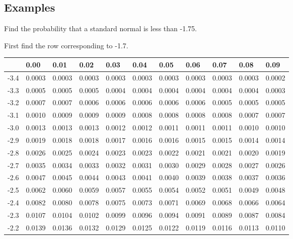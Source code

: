 \subsection{Examples}

\begin{frame}{\small Find the probability that a standard normal is less than -1.75.}
  
{\small First find the row corresponding to -1.7.}

  {
\fontsize{5pt}{5pt}
\selectfont

\begin{tabular}{l|llllllllll}
     & 0.00   & 0.01   & 0.02   & 0.03   &  0.04   & 0.05   & 0.06   & 0.07   & 0.08  & 0.09 \\ \hline
-3.4 & 0.0003 & 0.0003 & 0.0003 & 0.0003 & 0.0003 & 0.0003 & 0.0003 & 0.0003 & 0.0003 & 0.0002 \\ 
-3.3 & 0.0005 & 0.0005 & 0.0005 & 0.0004 & 0.0004 & 0.0004 & 0.0004 & 0.0004 & 0.0004 & 0.0003 \\ 
-3.2 & 0.0007 & 0.0007 & 0.0006 & 0.0006 & 0.0006 & 0.0006 & 0.0006 & 0.0005 & 0.0005 & 0.0005 \\ 
-3.1 & 0.0010 & 0.0009 & 0.0009 & 0.0009 & 0.0008 & 0.0008 & 0.0008 & 0.0008 & 0.0007 & 0.0007 \\ 
-3.0 & 0.0013 & 0.0013 & 0.0013 & 0.0012 & 0.0012 & 0.0011 & 0.0011 & 0.0011 & 0.0010 & 0.0010 \\ 
-2.9 & 0.0019 & 0.0018 & 0.0018 & 0.0017 & 0.0016 & 0.0016 & 0.0015 & 0.0015 & 0.0014 & 0.0014 \\ 
-2.8 & 0.0026 & 0.0025 & 0.0024 & 0.0023 & 0.0023 & 0.0022 & 0.0021 & 0.0021 & 0.0020 & 0.0019 \\ 
-2.7 & 0.0035 & 0.0034 & 0.0033 & 0.0032 & 0.0031 & 0.0030 & 0.0029 & 0.0028 & 0.0027 & 0.0026 \\ 
-2.6 & 0.0047 & 0.0045 & 0.0044 & 0.0043 & 0.0041 & 0.0040 & 0.0039 & 0.0038 & 0.0037 & 0.0036 \\ 
-2.5 & 0.0062 & 0.0060 & 0.0059 & 0.0057 & 0.0055 & 0.0054 & 0.0052 & 0.0051 & 0.0049 & 0.0048 \\ 
-2.4 & 0.0082 & 0.0080 & 0.0078 & 0.0075 & 0.0073 & 0.0071 & 0.0069 & 0.0068 & 0.0066 & 0.0064 \\ 
-2.3 & 0.0107 & 0.0104 & 0.0102 & 0.0099 & 0.0096 & 0.0094 & 0.0091 & 0.0089 & 0.0087 & 0.0084 \\ 
-2.2 & 0.0139 & 0.0136 & 0.0132 & 0.0129 & 0.0125 & 0.0122 & 0.0119 & 0.0116 & 0.0113 & 0.0110 \\ 

\end{tabular}}
\end{frame}

